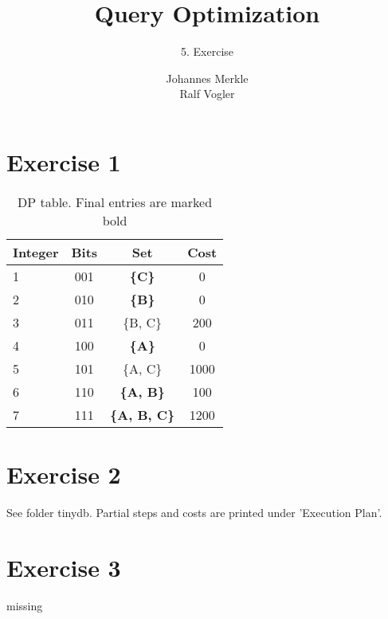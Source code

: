 \documentclass[11pt,a4paper]{scrartcl}
\begin{document}
\author{Johannes Merkle\\Ralf Vogler}
\title{Query Optimization}
\subtitle{5. Exercise}

\maketitle

\section*{Exercise 1}


\begin{table}[H]
  \caption{DP table. Final entries are marked bold}
  \begin{center}
 \begin{tabular}{l|c|c|c}
Integer & Bits & Set & Cost\\
\hline
1 & 001 &  \textbf{\{C\}} 		& 0\\
2 & 010 &  \textbf{\{B\}} 		& 0\\
3 & 011 & \{B, C\} 				& 200\\
4 & 100 &  \textbf{\{A\}} 		& 0\\
5 & 101 & \{A, C\} 				& 1000\\
6 & 110 &  \textbf{\{A, B\}} 		& 100\\
7 & 111 &  \textbf{\{A, B, C\}} 	& 1200\\
 \end{tabular}  
  \end{center}
 \label{tab:gp1}
\end{table}

\section*{Exercise 2}
See folder tinydb. Partial steps and costs are printed under 'Execution Plan'.

\section*{Exercise 3}

missing
\end{document}

